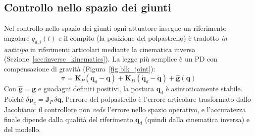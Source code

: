 \subsection{Controllo nello spazio dei giunti}

Nel controllo nello spazio dei giunti ogni attuatore insegue un riferimento angolare $q_{d,i}(t)$ e il compito (la posizione del polpastrello) è tradotto \emph{in anticipo} in riferimenti articolari mediante la cinematica inversa (Sezione~\ref{sec:inverse_kinematics}). La legge più semplice è un PD con compensazione di gravità (Figura~\ref{fig:blk_joint}):
\begin{equation}
    \boldsymbol\tau=\boldsymbol K_P(\boldsymbol q_d-\boldsymbol q)+\boldsymbol K_D(\dot{\boldsymbol q}_d-\dot{\boldsymbol q})+\hat{\boldsymbol g}(\boldsymbol q)
    \label{eq:ctrl_joint}
\end{equation}
Con $\hat{\boldsymbol g}=\boldsymbol g$ e guadagni definiti positivi, la postura $\boldsymbol q_d$ è asintoticamente stabile. Poiché $\delta\boldsymbol p_e=\boldsymbol J_P\,\delta\boldsymbol q$, l'errore del polpastrello è l'errore articolare trasformato dallo Jacobiano: il controllore non \emph{vede} l'errore nello spazio operativo, e l'accuratezza finale dipende dalla qualità del riferimento $\boldsymbol q_d$ (quindi dalla cinematica inversa) e del modello.

